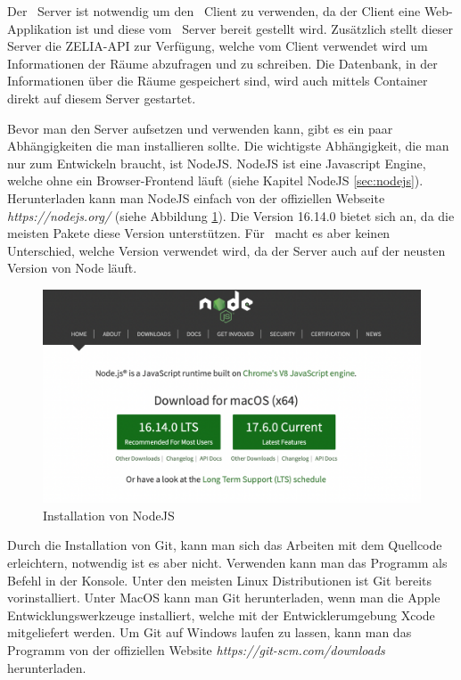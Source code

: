 
Der \ZELIA\ Server ist notwendig um den \ZELIA\ Client zu verwenden, da der Client eine Web-Applikation ist und diese vom \ZELIA\ Server bereit gestellt wird. Zusätzlich stellt dieser Server die ZELIA-API zur Verfügung, welche vom Client verwendet wird um Informationen der Räume abzufragen und zu schreiben. Die Datenbank, in der Informationen über die Räume gespeichert sind, wird auch mittels Container direkt auf diesem Server gestartet.

\begin{minipage}{\textwidth}
    
    Bevor man den Server aufsetzen und verwenden kann, gibt es ein paar Abhängigkeiten die man installieren sollte. Die wichtigste Abhängigkeit, die man nur zum Entwickeln braucht, ist NodeJS. NodeJS ist eine Javascript Engine, welche ohne ein Browser-Frontend läuft (siehe Kapitel NodeJS \ref{sec:nodejs}). Herunterladen kann man NodeJS einfach von der offiziellen Webseite \emph{https://nodejs.org/} (siehe Abbildung \ref{fig:nodejsdownload}). Die Version 16.14.0 bietet sich an, da die meisten Pakete diese Version unterstützen. Für \ZELIA\ macht es aber keinen Unterschied, welche Version verwendet wird, da der Server auch auf der neusten Version von Node läuft.
\end{minipage}
    
\begin{figure}[H]
    \centering
    \includegraphics[width=120mm]{media/Handbuch/nodejs.png}
    \caption{Installation von NodeJS}
    \label{fig:nodejsdownload}
\end{figure}


Durch die Installation von Git, kann man sich das Arbeiten mit dem Quellcode erleichtern, notwendig ist es aber nicht. Verwenden kann man das Programm als Befehl in der Konsole. Unter den meisten Linux Distributionen ist Git bereits vorinstalliert. Unter MacOS kann man Git herunterladen, wenn man die Apple Entwicklungswerkzeuge installiert, welche mit der Entwicklerumgebung Xcode mitgeliefert werden. Um Git auf Windows laufen zu lassen, kann man das Programm von der offiziellen Website \emph{https://git-scm.com/downloads} herunterladen.

